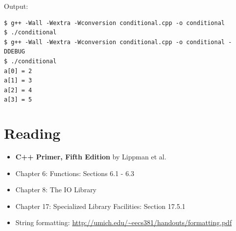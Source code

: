 \documentclass[12pt,letterpaper,twoside]{article}
\begin{document}
Output:

\begin{verbatim}
$ g++ -Wall -Wextra -Wconversion conditional.cpp -o conditional
$ ./conditional
$ g++ -Wall -Wextra -Wconversion conditional.cpp -o conditional -DDEBUG
$ ./conditional
a[0] = 2
a[1] = 3
a[2] = 4
a[3] = 5
\end{verbatim}

\section{Reading}
\begin{itemize}
\item
  \textbf{C++ Primer, Fifth Edition} by Lippman et al.
\item
  Chapter 6: Functions: Sections 6.1 - 6.3
\item
  Chapter 8: The IO Library
\item
  Chapter 17: Specialized Library Facilities: Section 17.5.1
\item String formatting: \url{http://umich.edu/~eecs381/handouts/formatting.pdf}
\end{itemize}
\end{document}
